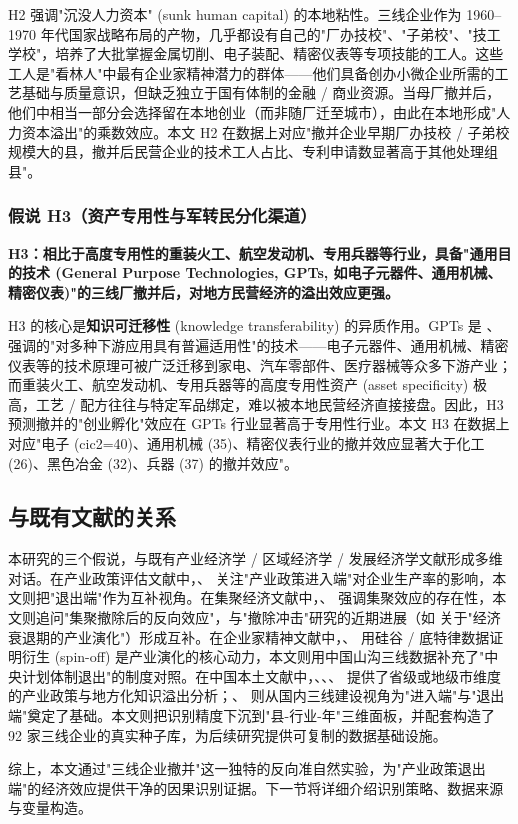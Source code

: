 H2 强调"沉没人力资本" (sunk human capital) 的本地粘性。三线企业作为 1960--1970 年代国家战略布局的产物，几乎都设有自己的"厂办技校"、"子弟校"、"技工学校"，培养了大批掌握金属切削、电子装配、精密仪表等专项技能的工人。这些工人是"看林人"中最有企业家精神潜力的群体——他们具备创办小微企业所需的工艺基础与质量意识，但缺乏独立于国有体制的金融 / 商业资源。当母厂撤并后，他们中相当一部分会选择留在本地创业（而非随厂迁至城市），由此在本地形成"人力资本溢出"的乘数效应。本文 H2 在数据上对应"撤并企业早期厂办技校 / 子弟校规模大的县，撤并后民营企业的技术工人占比、专利申请数显著高于其他处理组县"。

\subsubsection{假说 H3（资产专用性与军转民分化渠道）}

\textbf{H3：相比于高度专用性的重装火工、航空发动机、专用兵器等行业，具备"通用目的技术 (General Purpose Technologies, GPTs, 如电子元器件、通用机械、精密仪表)"的三线厂撤并后，对地方民营经济的溢出效应更强。}

H3 的核心是\textbf{知识可迁移性} (knowledge transferability) 的异质作用。GPTs 是 \citet{bresnahan1995}、\citet{helpman1998} 强调的"对多种下游应用具有普遍适用性"的技术——电子元器件、通用机械、精密仪表等的技术原理可被广泛迁移到家电、汽车零部件、医疗器械等众多下游产业；而重装火工、航空发动机、专用兵器等的高度专用性资产 (asset specificity) 极高，工艺 / 配方往往与特定军品绑定，难以被本地民营经济直接接盘。因此，H3 预测撤并的"创业孵化"效应在 GPTs 行业显著高于专用性行业。本文 H3 在数据上对应"电子 (cic2=40)、通用机械 (35)、精密仪表行业的撤并效应显著大于化工 (26)、黑色冶金 (32)、兵器 (37) 的撤并效应"。

\subsection{与既有文献的关系}

本研究的三个假说，与既有产业经济学 / 区域经济学 / 发展经济学文献形成多维对话。在产业政策评估文献中，\citet{house2020}、\citet{刘瑞明2015} 关注"产业政策进入端"对企业生产率的影响，本文则把"退出端"作为互补视角。在集聚经济文献中，\citet{combes2012}、\citet{rosenthal2003} 强调集聚效应的存在性，本文则追问"集聚撤除后的反向效应"，与"撤除冲击"研究的近期进展（如 \citet{bauducco2020} 关于"经济衰退期的产业演化"）形成互补。在企业家精神文献中，\citet{klepper1996}、\citet{hsu2016} 用硅谷 / 底特律数据证明衍生 (spin-off) 是产业演化的核心动力，本文则用中国山沟三线数据补充了"中央计划体制退出"的制度对照。在中国本土文献中，\citet{白重恩2016}、\citet{聂辉华2016}、\citet{刘瑞明2015}、\citet{陆铭2016} 提供了省级或地级市维度的产业政策与地方化知识溢出分析；\citet{徐现祥2017}、\citet{刘冲2020} 则从国内三线建设视角为"进入端"与"退出端"奠定了基础。本文则把识别精度下沉到"县-行业-年"三维面板，并配套构造了 92 家三线企业的真实种子库，为后续研究提供可复制的数据基础设施。

综上，本文通过"三线企业撤并"这一独特的反向准自然实验，为"产业政策退出端"的经济效应提供干净的因果识别证据。下一节将详细介绍识别策略、数据来源与变量构造。
